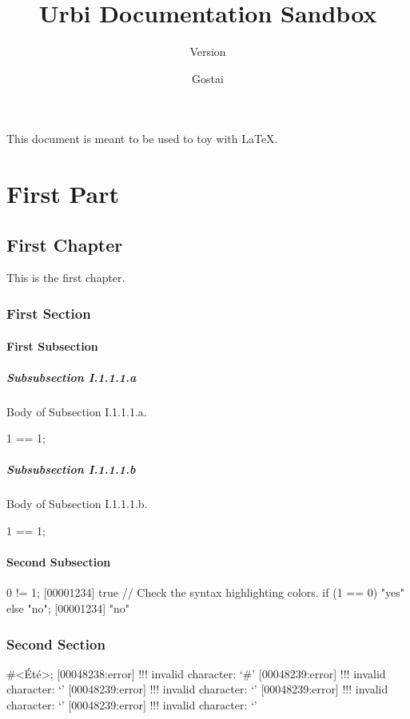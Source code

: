 \documentclass[openright,twoside,11pt]{book}
\title{Urbi Documentation Sandbox}
\subtitle{Version \VcsDescription}
\author{Gostai}
\begin{document}
\maketitle

This document is meant to be used to toy with \LaTeX{}.

\tableofcontents
\part{First Part}
\chapter{First Chapter}

This is the first chapter.

\section{First Section}

\subsection{First Subsection}
\subsubsection{Subsubsection I.1.1.1.a}
Body of Subsection I.1.1.1.a.

\begin{urbiassert}[firstnumber=1]
1 == 1;
\end{urbiassert}

\subsubsection{Subsubsection I.1.1.1.b}
Body of Subsection I.1.1.1.b.

\begin{urbiassert}[firstnumber=1]
1 == 1;
\end{urbiassert}

\subsection{Second Subsection}
\begin{urbiscript}
0 != 1;
[00001234] true
// Check the syntax highlighting colors.
if (1 == 0) "yes" else "no";
[00001234] "no"
\end{urbiscript}

\section{Second Section}
\begin{urbiunchecked}[escapeinside=<>]
#<Été>;
[00048238:error] !!! invalid character: `#'
[00048239:error] !!! invalid character: `'
[00048239:error] !!! invalid character: `'
[00048239:error] !!! invalid character: `'
[00048239:error] !!! invalid character: `'
\end{urbiunchecked}
\end{document}
